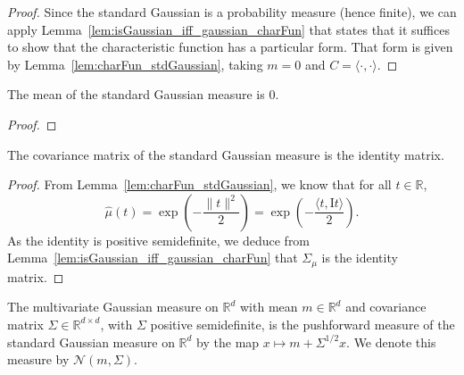 \begin{proof}\mathlibok
Since the standard Gaussian is a probability measure (hence finite), we can apply Lemma~\ref{lem:isGaussian_iff_gaussian_charFun} that states that it suffices to show that the characteristic function has a particular form.
That form is given by Lemma~\ref{lem:charFun_stdGaussian}, taking $m=0$ and $C = \langle\cdot, \cdot\rangle$.
\end{proof}


\begin{lemma}\label{lem:integral_id_stdGaussian}
  \mathlibok
The mean of the standard Gaussian measure is $0$.
\end{lemma}

\begin{proof}\mathlibok

\end{proof}


\begin{lemma}\label{lem:covMatrix_stdGaussian}
  \leanok
The covariance matrix of the standard Gaussian measure is the identity matrix.
\end{lemma}

\begin{proof}\leanok
From Lemma~\ref{lem:charFun_stdGaussian}, we know that for all $t \in \mathbb{R}$,
$$\hat{\mu}(t) = \exp\left(-\frac{\|t\|^2}{2}\right) = \exp\left(-\frac{\langle t, \mathrm{I}t\rangle}{2}\right).$$
As the identity is positive semidefinite, we deduce from Lemma~\ref{lem:isGaussian_iff_gaussian_charFun} that $\Sigma_\mu$ is the identity matrix.
\end{proof}


\begin{definition}\label{def:multivariateGaussian}
  \mathlibok
The multivariate Gaussian measure on $\mathbb{R}^d$ with mean $m \in \mathbb{R}^d$ and covariance matrix $\Sigma \in \mathbb{R}^{d \times d}$, with $\Sigma$ positive semidefinite, is the pushforward measure of the standard Gaussian measure on $\mathbb{R}^d$ by the map $x \mapsto m + \Sigma^{1/2} x$.
We denote this measure by $\mathcal{N}(m, \Sigma)$.
\end{definition}


